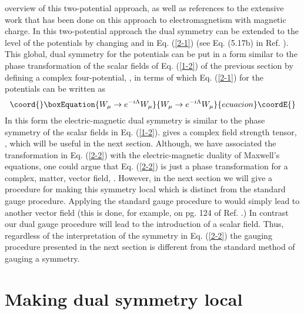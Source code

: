 \documentclass[a4paper,aps]{revtex4}
\begin{document}
overview of this two-potential approach, as well as
references to the extensive work that has been done on this
approach to electromagnetism with magnetic charge. In this two-potential
approach the dual symmetry can be extended to the level of
the potentials by changing \coordHE{} and
\coordHE{} in Eq. (\ref{2-1}) (see
Eq. (5.17b) in Ref. \cite{zwang}).
This global, dual symmetry for the potentials can be put in
a form similar to the phase transformation of the scalar fields
of Eq. (\ref{1-2}) of the previous section by defining a complex
four-potential, \coordHE{}, in terms of which
Eq. (\ref{2-1}) for the potentials can be written as
\begin{equation}\coord{}\boxEquation{
\label{2-2}
W_{\mu} \rightarrow e^{-i \Lambda} W_{\mu}
}{
W_{\mu} \rightarrow e^{-i \Lambda} W_{\mu}
}{ecuacion}\coordE{}\end{equation}
In this form the electric-magnetic dual symmetry is
similar to the phase symmetry of the scalar fields in
Eq. (\ref{1-2}). \coordHE{} gives a complex field
strength tensor, \coordHE{}, which will be useful in the next section.
Although, we have associated the transformation
in Eq. (\ref{2-2}) with the electric-magnetic duality of Maxwell's
equations, one could argue that Eq. (\ref{2-2}) is just a phase
transformation for a complex, matter, vector field, \coordHE{}. However,
in the next section we will give a procedure for making this symmetry
local which is distinct from the standard gauge procedure. Applying
the standard gauge procedure to \coordHE{} would simply lead
to another vector field (this is done, for example, on pg. 124 of
Ref. \cite{fels}.) In contrast our dual gauge procedure will
lead to the introduction of a scalar field. Thus, regardless of
the interpretation of the symmetry in Eq. (\ref{2-2}) the gauging
procedure presented in the next section is different from the
standard method of gauging a symmetry.

\section{Making dual symmetry local}
\end{document}
